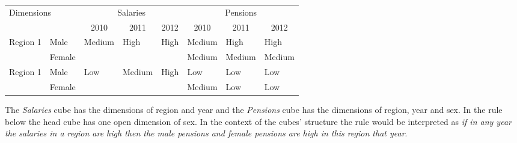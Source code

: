 \begin{table}[h]
\centering
\begin{tabular}{ll|lll|lll}
\multicolumn{2}{l|}{\multirow{2}{*}{Dimensions}} & \multicolumn{3}{c|}{Salaries}                                                   & \multicolumn{3}{c}{Pensions}                                                    \\
\multicolumn{2}{l|}{}                            & \multicolumn{1}{c}{2010} & \multicolumn{1}{c}{2011} & \multicolumn{1}{c|}{2012} & \multicolumn{1}{c}{2010} & \multicolumn{1}{c}{2011} & \multicolumn{1}{c}{2012}  \\ 
\hline
\multirow{2}{*}{Region 1} & Male                 & \multirow{2}{*}{Medium}  & \multirow{2}{*}{High}    & \multirow{2}{*}{High}     & Medium                   & High                     & High                      \\
                          & Female               &                          &                          &                           & Medium                   & Medium                   & Medium                    \\
\multirow{2}{*}{Region 1} & Male                 & \multirow{2}{*}{Low}     & \multirow{2}{*}{Medium}  & \multirow{2}{*}{High}     & Low                      & Low                      & Low                       \\
                          & Female               &                          &                          &                           & Medium                   & Low                      & Low                      
\end{tabular}
\end{table}

The \textit{Salaries} cube has the dimensions of region and year and the \textit{Pensions} cube has the dimensions of region, year and sex. In the rule below the head cube has one open dimension of sex. In the context of the cubes' structure the rule would be interpreted as \textit{if in any year the salaries in a region are high then the male pensions and female pensions are high in this region that year}. 

